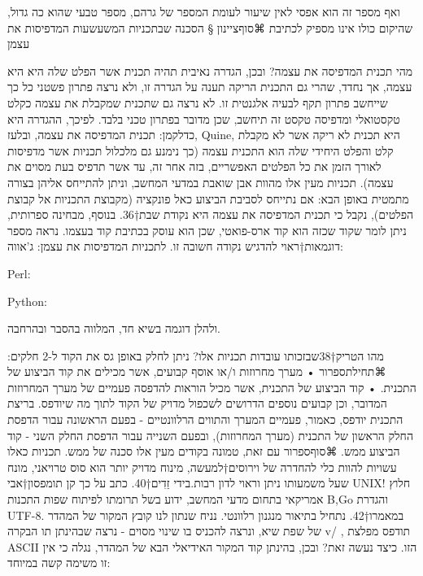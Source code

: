     ואף מספר זה הוא אפסי לאין שיעור לעומת המספר של גרהם, מספר טבעי שהוא כה גדול,
    שהיקום כולו אינו מספיק לכתיבת
 ⌘סוף{ציינון}     
 §    הסכנה שבתכניות המשעשעות המדפיסות את עצמן
    
    מהי תכנית המדפיסה את עצמה? ובכן, הגדרה נאיבית תהיה תכנית אשר הפלט שלה היא היא עצמה, אך נחדד, שהרי גם התכנית הריקה תענה על הגדרה זו, ולא נרצה פתרון פשטני כל כך שייחשב פתרון תקף לבעיה אלגנטית זו. לא נרצה גם שתכנית שמקבלת את עצמה כקלט טקסטואלי ומדפיסה טקסט זה תיחשב, שכן מדובר בפתרון טכני בלבד.
    לפיכך, ההגדרה היא כדלקמן: תכנית המדפיסה את עצמה, ובלעז, Quine, היא תכנית לא ריקה אשר לא מקבלת קלט והפלט היחידי שלה הוא התכנית עצמה (כך נימנע גם מלכלול תכניות אשר מדפיסות לאורך הזמן את כל הפלטים האפשריים, בזה אחר זה, עד אשר תדפיס בעת מסוים את עצמה). תכניות מעין אלו מהוות אבן שואבת במדעי המחשב, וניתן להתייחס אליהן בצורה מתמטית באופן הבא: אם נתייחס לסביבת הביצוע כאל פונקציה (מקבוצת התכניות אל קבוצת הפלטים), נקבל כי תכנית המדפיסה את עצמה היא נקודת שבת†{36}.
    בנוסף, מבחינה ספרותית, ניתן לומר שקוד שכזה הוא קוד ארס-פואטי, שכן הוא עוסק בכתיבת קוד בעצמו.
    נראה מספר דוגמאות†{ראוי להדגיש נקודה חשובה זו.} לתכניות המדפיסות את עצמן:
    ג'אווה:
    
    Perl:
    
    Python:
    
    ולהלן דוגמה בשיא חד, המלווה בהסבר ובהרחבה.
    
    מהו הטריק†{38}שבזכותו עובדות תכניות אלו? ניתן לחלק באופן גס את הקוד ל-2 חלקים:
   ⌘תחילת{ספרור}
   •  מערך מחרוזות ו/או אוסף קבועים, אשר מכילים את קוד
    הביצוע של התכנית.
   •  קוד הביצוע של התכנית, אשר מכיל הוראות להדפסה פעמיים
    של מערך המחרוזות המדובר, וכן קבועים נוספים הדרושים
    לשכפול מדויק של הקוד לתוך מה שיודפס. בריצת התכנית
    יודפס, כאמור, פעמיים המערך והתווים הרלוונטיים - בפעם
    הראשונה עבור הדפסת החלק הראשון של התכנית (מערך
    המחרוזות), ובפעם השנייה עבור הדפסת החלק השני - קוד
    הביצוע ממש.
     ⌘סוף{ספרור}   
    עם זאת, טמונה בקודים מעין אלו סכנה של ממש. תכניות כאלו עשויות להוות כלי להחדרה
    של וירוסים†{למעשה, מינוח מדויק יותר הוא סוס טרויאני, מונח שעל משמעותו ניתן וראוי לדון רבות.}בידי זֵדִים†{40}. כתב על כך קן תומפסון†{אבי UNIX! חלוץ אמריקאי בתחום מדעי המחשב, ידוע בשל תרומתו לפיתוח שפות התכנות B,Go והגדרת UTF-8.} במאמרו†{42}. נתחיל
בתיאור מנגנון רלוונטי. נניח שנתון לנו קובץ המקור של המהדר של שפת שיא, ונרצה
להכניס בו שינוי מסוים - נרצה שבהינתן תו הבקרה v/ , תודפס מפלצת ASCII הזו. כיצד
נעשה זאת? ובכן, בהינתן קוד המקור האידיאלי הבא של המהדר, נגלה כי אין זו משימה
קשה במיוחד:

